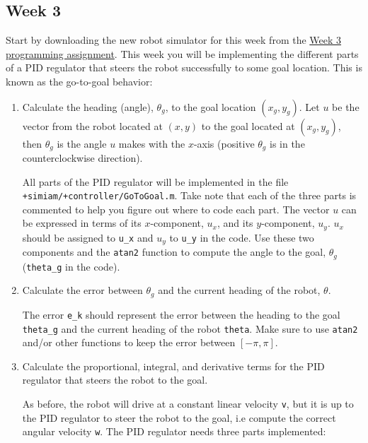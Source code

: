 \documentclass[10pt]{article}
\begin{document}
\newpage
\subsection{Week 3}

Start by downloading the new robot simulator for this week from the \href{}{Week 3 programming assignment}. This week you will be implementing the different parts of a PID regulator that steers the robot successfully to some goal location. This is known as the go-to-goal behavior:

\begin{enumerate}
 \item Calculate the heading (angle), $\theta_g$, to the goal location $(x_g,y_g)$. Let $u$ be the vector from the robot located at $(x,y)$ to the goal located at $(x_g,y_g)$, then $\theta_g$ is the angle $u$ makes with the $x$-axis (positive $\theta_g$ is in the counterclockwise direction).

All parts of the PID regulator will be implemented in the file \texttt{+simiam/+controller/GoToGoal.m}. Take note that each of the three parts is commented to help you figure out where to code each part. The vector $u$ can be expressed in terms of its $x$-component, $u_x$, and its $y$-component, $u_y$. $u_x$ should be assigned to \texttt{u\_x} and $u_y$ to \texttt{u\_y} in the code. Use these two components and the \texttt{atan2} function to compute the angle to the goal, $\theta_g$ (\texttt{theta\_g} in the code).


 \item Calculate the error between $\theta_g$ and the current heading of the robot, $\theta$.
 
 The error \texttt{e\_k} should represent the error between the heading to the goal \texttt{theta\_g} and the current heading of the robot \texttt{theta}. Make sure to use \texttt{atan2} and/or other functions to keep the error between $[-\pi,\pi]$.
 
 \item Calculate the proportional, integral, and derivative terms for the PID regulator that steers the robot to the goal.
 
 As before, the robot will drive at a constant linear velocity \texttt{v}, but it is up to the PID regulator to steer the robot to the goal, i.e compute the correct angular velocity \texttt{w}. The PID regulator needs three parts implemented:
 

\end{enumerate}
\end{document}
